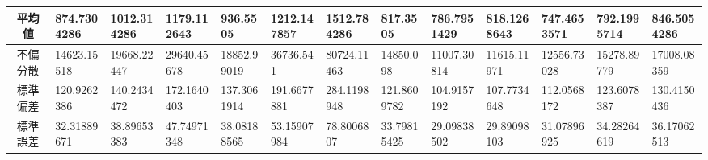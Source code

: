 \begin{tabularx}{\textwidth}{|c|L|L|L|L|L|L|L|L|L|L|L|L|}
    平均値                 & 874.7304286                  & 1012.314286                   & 1179.112643                   & 936.5505                      & 1212.147857 & 1512.784286 & 817.3505    & 786.7951429 & 818.1268643 & 747.4653571 & 792.1995714 & 846.5054286 \\ \hline
    不偏分散                & 14623.15518                  & 19668.22447                   & 29640.45678                   & 18852.99019                   & 36736.541   & 80724.11463 & 14850.098   & 11007.30814 & 11615.11971 & 12556.73028 & 15278.89779 & 17008.08359 \\ \hline
    標準偏差                & 120.9262386                  & 140.2434472                   & 172.1640403                   & 137.3061914                   & 191.6677881 & 284.1198948 & 121.8609782 & 104.9157192 & 107.7734648 & 112.0568172 & 123.6078387 & 130.4150436 \\ \hline
    標準誤差                & 32.31889671                  & 38.89653383                   & 47.74971348                   & 38.08188565                   & 53.15907984 & 78.8006807  & 33.79815425 & 29.09838502 & 29.89098103 & 31.07896925 & 34.28264619 & 36.17062513 \\ \hline
\end{tabularx}

